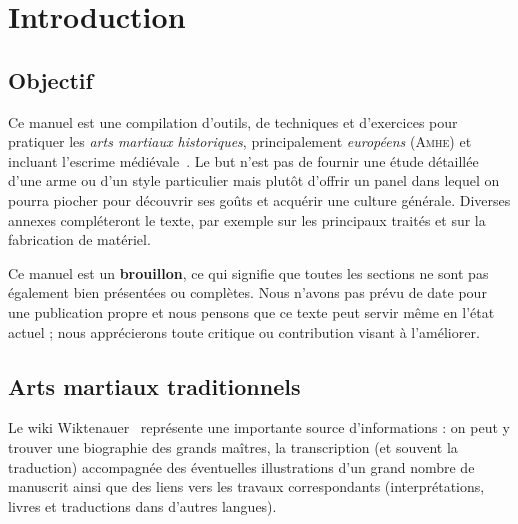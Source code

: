 \chapter{Introduction}


\section{Objectif}


Ce manuel est une compilation d'outils, de techniques et d'exercices pour pratiquer les \emph{arts martiaux historiques}, principalement \emph{européens} (\textsc{Amhe}) et incluant l'escrime médiévale~\footnotemark{}.
Le but n'est pas de fournir une étude détaillée d'une arme ou d'un style particulier mais plutôt d'offrir un panel dans lequel on pourra piocher pour découvrir ses goûts et acquérir une culture générale.
Diverses annexes compléteront le texte, par exemple sur les principaux traités et sur la fabrication de matériel.

Ce manuel est un \textbf{brouillon}, ce qui signifie que toutes les sections ne sont pas également bien présentées ou complètes.
Nous n'avons pas prévu de date pour une publication propre et nous pensons que ce texte peut servir même en l'état actuel ; nous apprécierons toute critique ou contribution visant à l'améliorer.


\section{Arts martiaux traditionnels}




Le wiki Wiktenauer~\cite{wiktenauer} représente une importante source d'informations : on peut y trouver une biographie des grands maîtres, la transcription (et souvent la traduction) accompagnée des éventuelles illustrations d'un grand nombre de manuscrit ainsi que des liens vers les travaux correspondants (interprétations, livres et traductions dans d'autres langues).

